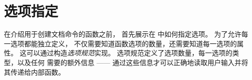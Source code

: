 \documentclass{l3doc}
\begin{document}
\section{选项指定}

%
在介绍用于创建文档命令的函数之前，
首先展示在  中如何指定选项。
为了允许每一选项都能独立定义，
 不仅需要知道函数选项的数量，还需要知道每一选项的属性。
这可以通过构造\emph{选项规范}实现。
选项规范定义了选项数量，每一选项的类型，以及任何  需要的额外信息
—— 通过这些信息才可以正确地读取用户输入并将其传递给内部函数。
\end{document}
